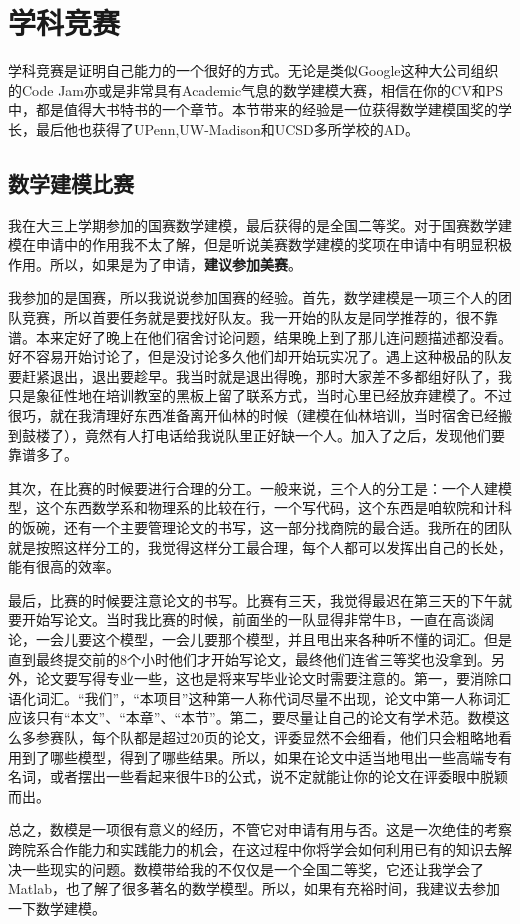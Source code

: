 \section{学科竞赛}
学科竞赛是证明自己能力的一个很好的方式。无论是类似Google这种大公司组织的Code Jam亦或是非常具有Academic气息的数学建模大赛，相信在你的CV和PS中，都是值得大书特书的一个章节。本节带来的经验是一位获得数学建模国奖的学长，最后他也获得了UPenn,UW-Madison和UCSD多所学校的AD。

\subsection{数学建模比赛}
我在大三上学期参加的国赛数学建模，最后获得的是全国二等奖。对于国赛数学建模在申请中的作用我不太了解，但是听说美赛数学建模的奖项在申请中有明显积极作用。所以，如果是为了申请，\textbf{建议参加美赛}。\par
我参加的是国赛，所以我说说参加国赛的经验。首先，数学建模是一项三个人的团队竞赛，所以首要任务就是要找好队友。我一开始的队友是同学推荐的，很不靠谱。本来定好了晚上在他们宿舍讨论问题，结果晚上到了那儿连问题描述都没看。好不容易开始讨论了，但是没讨论多久他们却开始玩实况了。遇上这种极品的队友要赶紧退出，退出要趁早。我当时就是退出得晚，那时大家差不多都组好队了，我只是象征性地在培训教室的黑板上留了联系方式，当时心里已经放弃建模了。不过很巧，就在我清理好东西准备离开仙林的时候（建模在仙林培训，当时宿舍已经搬到鼓楼了），竟然有人打电话给我说队里正好缺一个人。加入了之后，发现他们要靠谱多了。\par
其次，在比赛的时候要进行合理的分工。一般来说，三个人的分工是：一个人建模型，这个东西数学系和物理系的比较在行，一个写代码，这个东西是咱软院和计科的饭碗，还有一个主要管理论文的书写，这一部分找商院的最合适。我所在的团队就是按照这样分工的，我觉得这样分工最合理，每个人都可以发挥出自己的长处，能有很高的效率。\par
最后，比赛的时候要注意论文的书写。比赛有三天，我觉得最迟在第三天的下午就要开始写论文。当时我比赛的时候，前面坐的一队显得非常牛B，一直在高谈阔论，一会儿要这个模型，一会儿要那个模型，并且甩出来各种听不懂的词汇。但是直到最终提交前的8个小时他们才开始写论文，最终他们连省三等奖也没拿到。另外，论文要写得专业一些，这也是将来写毕业论文时需要注意的。第一，要消除口语化词汇。“我们”，“本项目”这种第一人称代词尽量不出现，论文中第一人称词汇应该只有“本文”、“本章”、“本节”。第二，要尽量让自己的论文有学术范。数模这么多参赛队，每个队都是超过20页的论文，评委显然不会细看，他们只会粗略地看用到了哪些模型，得到了哪些结果。所以，如果在论文中适当地甩出一些高端专有名词，或者摆出一些看起来很牛B的公式，说不定就能让你的论文在评委眼中脱颖而出。\par
总之，数模是一项很有意义的经历，不管它对申请有用与否。这是一次绝佳的考察跨院系合作能力和实践能力的机会，在这过程中你将学会如何利用已有的知识去解决一些现实的问题。数模带给我的不仅仅是一个全国二等奖，它还让我学会了Matlab，也了解了很多著名的数学模型。所以，如果有充裕时间，我建议去参加一下数学建模。

